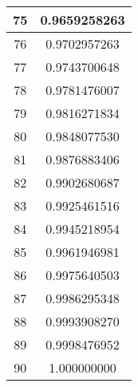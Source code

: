 \documentclass[12pt]{article}
\begin{document}
\begin{tabular}{||c|c||}
 75 & 0.9659258263 \\\hline
 76 & 0.9702957263
\\\hline
 77 &
   0.9743700648 \\\hline
 78 & 0.9781476007 \\\hline
 79 & 0.9816271834 \\\hline
 80 &
0.9848077530 \\\hline
 81 & 0.9876883406 \\\hline
 82 & 0.9902680687 \\\hline
 83 & 0.9925461516
\\\hline
 84 &
   0.9945218954 \\\hline
 85 & 0.9961946981 \\\hline
 86 & 0.9975640503 \\\hline
 87 &
0.9986295348 \\\hline
 88 & 0.9993908270 \\\hline
 89 & 0.9998476952 \\\hline
 90 & 1.000000000
\\\hline
\end{tabular}
\bigskip
\end{document}

